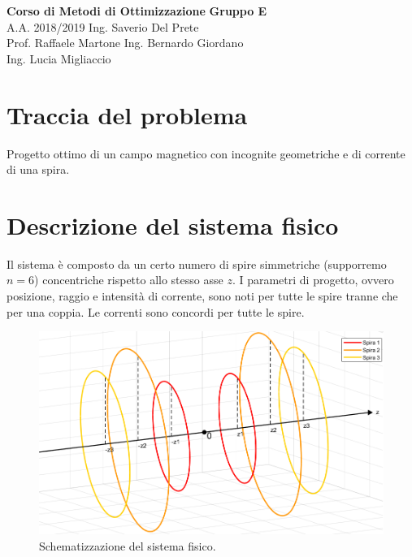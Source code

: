 \documentclass[a4paper, 11pt]{article}
\begin{document}
\noindent
\large\textbf{Corso di Metodi di Ottimizzazione} \hfill \textbf{Gruppo E} \\
\normalsize A.A. 2018/2019 \hfill Ing. Saverio Del Prete \\
Prof. Raffaele Martone \hfill Ing. Bernardo Giordano \\
\hphantom{}\hfill Ing. Lucia Migliaccio

\section*{Traccia del problema}

Progetto ottimo di un campo magnetico con incognite geometriche e di corrente di
una spira.

\section*{Descrizione del sistema fisico}

Il sistema è composto da un certo numero di spire simmetriche (supporremo $n=6$)
concentriche rispetto allo stesso asse $z$. I parametri di progetto, ovvero
posizione, raggio e intensità di corrente, sono noti per tutte le spire tranne
che per una coppia. Le correnti sono concordi per tutte le spire. 

\begin{figure}[H]
    \centering
    \includegraphics[width=12cm]{assets/figure1}
    \caption{Schematizzazione del sistema fisico.}
\end{figure}
\end{document}
